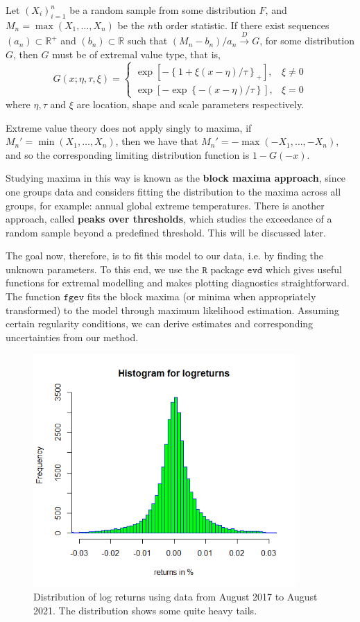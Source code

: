 \documentclass[twoside]{report}
\newcommand{\code}{\texttt}
\begin{document}
\begin{spacing}{1}
Let $(X_i)_{i=1}^n$ be a random sample from some distribution $F$, and $M_n = \max(X_1, \ldots, X_n)$ be the $n$th order statistic. If there exist sequences $(a_n) \subset \mathbb{R}^+$ and $(b_n) \subset \mathbb{R}$ such that $(M_n - b_n)/a_n \overset{D}{\to} G$, for some distribution $G$, then $G$ must be of extremal value type, that is, \[
G(x; \eta, \tau, \xi) = \begin{cases}
\exp\left[-\left\{1+\xi(x-\eta)/\tau\right\}_+\right], & \xi \ne 0\\
\exp\left[-\exp\left\{-(x-\eta)/\tau\right\}\right], & \xi = 0
\end{cases}
\]
where $\eta, \tau$ and $\xi$ are location, shape and scale parameters respectively. \begin{remark}
Extreme value theory does not apply singly to maxima, if $M_n' = \min(X_1, \ldots, X_n)$, then we have that $M_n' = -\max(-X_1, \ldots, -X_n)$, and so the corresponding limiting distribution function is $1-G(-x)$. 
\end{remark}

Studying maxima in this way is known as the \textbf{block maxima approach}, since one groups data and considers fitting the distribution to the maxima across all groups, for example: annual global extreme temperatures. There is another approach, called \textbf{peaks over thresholds}, which studies the exceedance of a random sample beyond a predefined threshold. This will be discussed later.


The goal now, therefore, is to fit this model to our data, i.e. by finding the unknown parameters. To this end, we use the $\code{R}$ package $\code{evd}$ which gives useful functions for extremal modelling and makes plotting diagnostics straightforward. The function $\code{fgev}$ fits the block maxima (or minima when appropriately transformed) to the model through maximum likelihood estimation. Assuming certain regularity conditions, we can derive estimates and corresponding uncertainties from our method.  
\begin{figure}
    \centering
    \includegraphics[width=\linewidth, height=3.5in]{TestPlots/Histogram log-returns2.png}
    \caption{Distribution of log returns using data from August 2017 to August 2021. The distribution shows some quite heavy tails.}
    \label{fig:hist_logreturn_17_21}
\end{figure}


\end{spacing}
\end{document}
